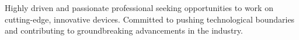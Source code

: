 \documentclass[letter,10pt]{article}
\begin{document}

Highly driven and passionate professional seeking opportunities to work on cutting-edge, innovative devices. \newline
Committed to pushing technological boundaries and contributing to groundbreaking advancements in the industry.
\end{document}
